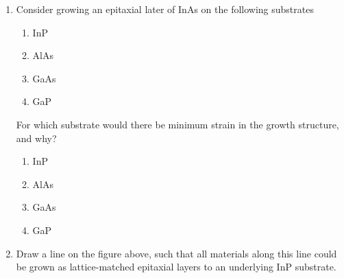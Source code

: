 \documentclass[fleqn, a4paper, 11pt, oneside]{amsart}
\theoremstyle{definition}
\theoremstyle{theorem}
\begin{document}
\begin{question}
\begin{figure}[H]
	\end{figure}
	\begin{enumerate}
		\item
			Consider growing an epitaxial later of InAs on the following substrates
			\begin{enumerate}
				\item InP
				\item AlAs
				\item GaAs
				\item GaP
			\end{enumerate}
			For which substrate would there be minimum strain in the growth structure, and why?
			\begin{enumerate}
				\item InP
				\item AlAs
				\item GaAs
				\item GaP
			\end{enumerate}
		\item
			Draw a line on the figure above, such that all materials along this line could be grown as lattice-matched epitaxial layers to an underlying InP substrate.
	\end{enumerate}
\end{question}
\end{document}

